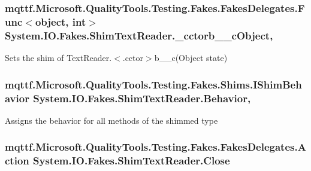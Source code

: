 \hypertarget{class_system_1_1_i_o_1_1_fakes_1_1_shim_text_reader_a2b9e5500b02696f81c8ee291f13a71d4}{
\subsubsection[{\-\_\-cctorb\-\_\-\-\_\-c\-Object}]{\setlength{\rightskip}{0pt plus 5cm}mqttf.\-Microsoft.\-Quality\-Tools.\-Testing.\-Fakes.\-Fakes\-Delegates.\-Func$<$object, int$>$ System.\-I\-O.\-Fakes.\-Shim\-Text\-Reader.\-\_\-cctorb\-\_\-\-\_\-c\-Object\hspace{0.3cm}{\ttfamily [static]}, {\ttfamily [set]}}}\label{class_system_1_1_i_o_1_1_fakes_1_1_shim_text_reader_a2b9e5500b02696f81c8ee291f13a71d4}


Sets the shim of Text\-Reader.$<$.cctor$>$b\-\_\-\-\_\-c(\-Object state)

\hypertarget{class_system_1_1_i_o_1_1_fakes_1_1_shim_text_reader_a07713033a1b368a4ad9cc73caee1e2ab}{
\subsubsection[{Behavior}]{\setlength{\rightskip}{0pt plus 5cm}mqttf.\-Microsoft.\-Quality\-Tools.\-Testing.\-Fakes.\-Shims.\-I\-Shim\-Behavior System.\-I\-O.\-Fakes.\-Shim\-Text\-Reader.\-Behavior\hspace{0.3cm}{\ttfamily [static]}, {\ttfamily [set]}}}\label{class_system_1_1_i_o_1_1_fakes_1_1_shim_text_reader_a07713033a1b368a4ad9cc73caee1e2ab}


Assigns the behavior for all methods of the shimmed type

\hypertarget{class_system_1_1_i_o_1_1_fakes_1_1_shim_text_reader_acd749ea7cd7144e08ac5ba4218173d38}{
\subsubsection[{Close}]{\setlength{\rightskip}{0pt plus 5cm}mqttf.\-Microsoft.\-Quality\-Tools.\-Testing.\-Fakes.\-Fakes\-Delegates.\-Action System.\-I\-O.\-Fakes.\-Shim\-Text\-Reader.\-Close\hspace{0.3cm}{\ttfamily [set]}}}\label{class_system_1_1_i_o_1_1_fakes_1_1_shim_text_reader_acd749ea7cd7144e08ac5ba4218173d38}



